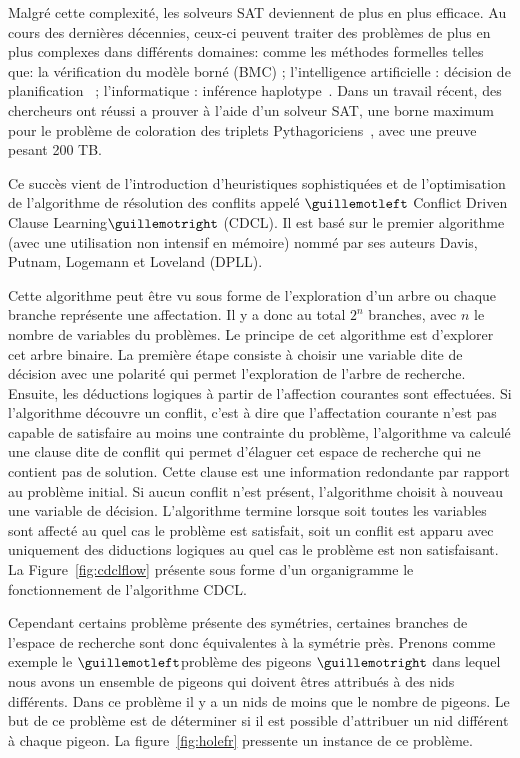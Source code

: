 Malgré cette complexité, les solveurs SAT deviennent de plus en plus efficace.
Au cours des dernières décennies, ceux-ci peuvent traiter des problèmes de plus en plus complexes dans différents domaines: comme les méthodes formelles telles que: la vérification du modèle borné (BMC)\cite{bmc_99} ; l'intelligence artificielle : décision de planification~\cite{planning_92} ; l'informatique : inférence haplotype~\cite{biology_06}. 
Dans un travail récent, des chercheurs ont réussi a prouver à l'aide d'un solveur SAT, une borne maximum
pour le problème de coloration des triplets Pythagoriciens~\cite{heule2016solving}, avec une preuve pesant 200 TB.

Ce succès vient de l'introduction d'heuristiques sophistiquées et de l'optimisation de l'algorithme de
résolution des conflits appelé $\guillemotleft$ Conflict Driven Clause Learning$\guillemotright$ (CDCL). Il est basé sur le premier
algorithme (avec une utilisation non intensif en mémoire) nommé par ses auteurs Davis, Putnam, Logemann
et Loveland (DPLL)\cite{dpll_62}.


Cette algorithme peut être vu sous forme de l'exploration d'un arbre ou chaque branche représente 
une affectation. Il y a donc au total $2^n$ branches, avec $n$ le nombre de variables du problèmes.
Le principe de cet algorithme est d'explorer cet arbre binaire. 
La première étape consiste à choisir une variable dite de décision avec une polarité qui permet l'exploration
de l'arbre de recherche. Ensuite, les déductions logiques à partir de l'affection courantes sont effectuées. 
Si l'algorithme découvre un conflit, c'est à dire que l'affectation courante n'est pas capable de satisfaire au moins une contrainte du problème, l'algorithme va calculé une clause dite de conflit qui permet d'élaguer 
cet espace de recherche qui ne contient pas de solution. Cette clause est une information redondante par
rapport au problème initial. Si aucun conflit n'est présent, l'algorithme choisit à nouveau une variable de décision. L'algorithme termine lorsque soit toutes les variables sont affecté au quel cas le problème 
est satisfait, soit un conflit est apparu avec uniquement des diductions logiques au quel cas le
problème est non satisfaisant.
La Figure~\ref{fig:cdclflow} présente sous forme d'un organigramme le fonctionnement de l'algorithme CDCL.




Cependant certains problème présente des symétries, certaines branches de l'espace de recherche 
sont donc équivalentes à la symétrie près. Prenons comme exemple le $\guillemotleft$problème des pigeons $\guillemotright$ dans lequel nous avons un ensemble de pigeons qui doivent êtres attribués à des nids différents. Dans ce problème il y a un nids de moins que le nombre de pigeons.
Le but de ce problème est de déterminer si il est possible d'attribuer un nid différent à chaque pigeon.
 La figure~\ref{fig:holefr} pressente un instance de ce problème.
 
